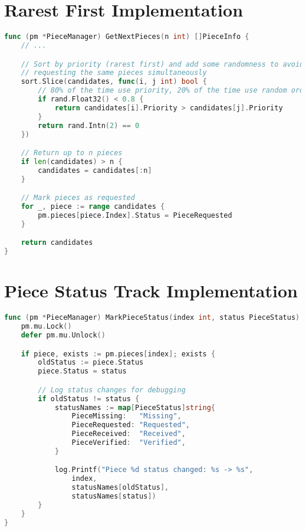 \documentclass[12pt,a4paper]{report}
\begin{document}
\section{Rarest First Implementation}
\begin{lstlisting}[language=Go, caption={Rarest First code}, label={lst:rarest-first}]
func (pm *PieceManager) GetNextPieces(n int) []PieceInfo {
    // ...

    // Sort by priority (rarest first) and add some randomness to avoid all clients
    // requesting the same pieces simultaneously
    sort.Slice(candidates, func(i, j int) bool {
        // 80% of the time use priority, 20% of the time use random order
        if rand.Float32() < 0.8 {
            return candidates[i].Priority > candidates[j].Priority
        }
        return rand.Intn(2) == 0
    })

    // Return up to n pieces
    if len(candidates) > n {
        candidates = candidates[:n]
    }

    // Mark pieces as requested
    for _, piece := range candidates {
        pm.pieces[piece.Index].Status = PieceRequested
    }

    return candidates
}
\end{lstlisting}

\section{Piece Status Track Implementation}
\begin{lstlisting}[language=Go, caption={Piece Status Track Code}, label={lst:status-tracking}]
func (pm *PieceManager) MarkPieceStatus(index int, status PieceStatus) {
	pm.mu.Lock()
	defer pm.mu.Unlock()

	if piece, exists := pm.pieces[index]; exists {
		oldStatus := piece.Status
		piece.Status = status

		// Log status changes for debugging
		if oldStatus != status {
			statusNames := map[PieceStatus]string{
				PieceMissing:   "Missing",
				PieceRequested: "Requested",
				PieceReceived:  "Received",
				PieceVerified:  "Verified",
			}

			log.Printf("Piece %d status changed: %s -> %s",
				index,
				statusNames[oldStatus],
				statusNames[status])
		}
	}
}
\end{lstlisting}
\end{document}

